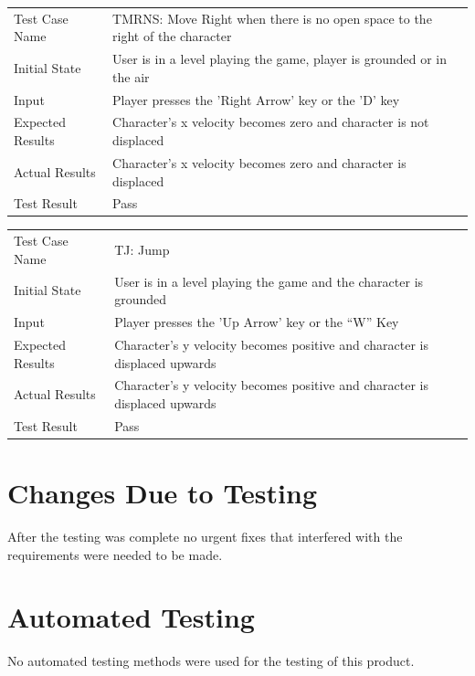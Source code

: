 \documentclass[12pt, titlepage]{article}
\begin{document}
\begin{center}
\begin{tabular}{ | l | p{10cm} | }
\hline
Test Case Name & TMRNS:  Move Right when there is no open space to the right of the character	\\
Initial State & User is in a level playing the game, player is grounded or in the air	\\
Input & Player presses the 'Right Arrow' key or the 'D' key	\\
Expected Results & Character's x velocity becomes zero and character is not displaced	\\
Actual Results & Character's x velocity becomes zero and character is displaced	\\
Test Result & Pass	\\
\hline
\end{tabular}
\end{center}

\begin{center}
\begin{tabular}{ | l | p{10cm} | }
\hline
Test Case Name & TJ: Jump	\\
Initial State & User is in a level playing the game and the character is grounded	\\
Input & Player presses the 'Up Arrow' key or the “W” Key	\\
Expected Results & Character's y velocity becomes positive and character is displaced upwards	\\
Actual Results & Character's y velocity becomes positive and character is displaced upwards	\\
Test Result & Pass	\\
\hline
\end{tabular}
\end{center}

\section{Changes Due to Testing}
After the testing was complete no urgent fixes that interfered with the requirements were needed to be made.

\section{Automated Testing}
No automated testing methods were used for the testing of this product.
		
\end{document}

